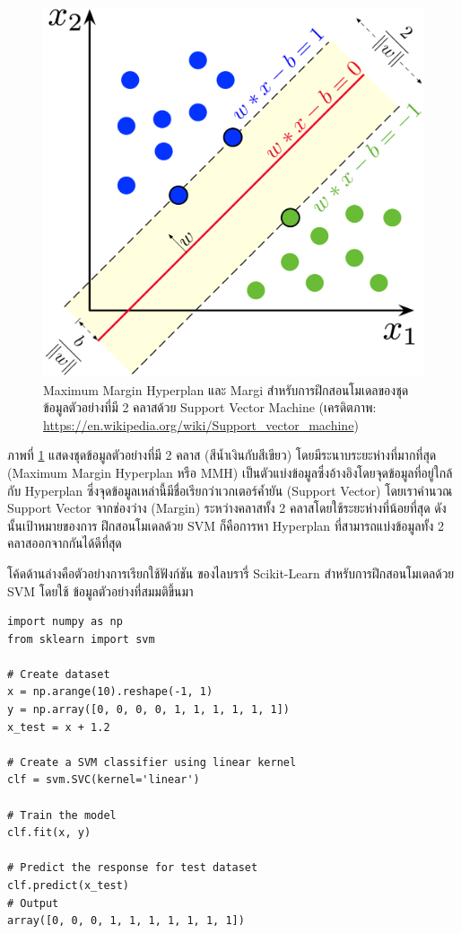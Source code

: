 \begin{figure}[htbp]
    \centering
    \includegraphics[width=0.65\linewidth]{fig/svm.png}
    \caption{Maximum Margin Hyperplan และ Margi สำหรับการฝึกสอนโมเดลของชุดข้อมูลตัวอย่างที่มี 2 คลาสด้วย Support Vector 
    Machine (เครดิตภาพ: \url{https://en.wikipedia.org/wiki/Support_vector_machine})}
    \label{fig:svm_margin}
\end{figure}

ภาพที่ \ref{fig:svm_margin} แสดงชุดข้อมูลตัวอย่างที่มี 2 คลาส (สีน้ำเงินกับสีเขียว) โดยมีระนาบระยะห่างที่มากที่สุด (Maximum Margin 
Hyperplan หรือ MMH) เป็นตัวแบ่งข้อมูลซึ่งอ้างอิงโดยจุดข้อมูลที่อยู่ใกล้กับ Hyperplan ซึ่งจุดข้อมูลเหล่านี้มีชื่อเรียกว่าเวกเตอร์ค้ำยัน (Support 
Vector) โดยเราคำนวณ Support Vector จากช่องว่าง (Margin) ระหว่างคลาสทั้ง 2 คลาสโดยใช้ระยะห่างที่น้อยที่สุด ดังนั้นเป้าหมายของการ%
ฝึกสอนโมเดลด้วย SVM ก็คือการหา Hyperplan ที่สามารถแบ่งข้อมูลทั้ง 2 คลาสออกจากกันได้ดีที่สุด

โค้ดด้านล่างคือตัวอย่างการเรียกใช้ฟังก์ชัน  ของไลบรารี่ Scikit-Learn สำหรับการฝึกสอนโมเดลด้วย SVM โดยใช้%
ข้อมูลตัวอย่างที่สมมติขึ้นมา

\begin{lstlisting}[style=MyPython]
import numpy as np
from sklearn import svm

# Create dataset
x = np.arange(10).reshape(-1, 1)
y = np.array([0, 0, 0, 0, 1, 1, 1, 1, 1, 1])
x_test = x + 1.2

# Create a SVM classifier using linear kernel
clf = svm.SVC(kernel='linear')

# Train the model
clf.fit(x, y)

# Predict the response for test dataset
clf.predict(x_test)
# Output
array([0, 0, 0, 1, 1, 1, 1, 1, 1, 1])
\end{lstlisting}

